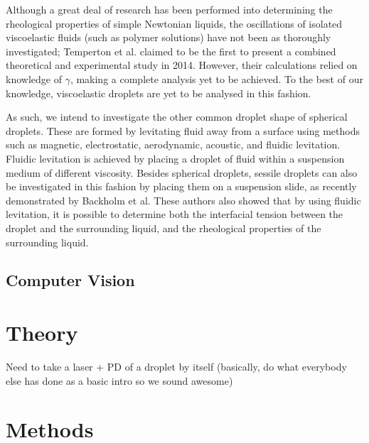 \documentclass{physics_article_B}
\begin{document}
Although a great deal of research has been performed into determining the rheological properties of simple Newtonian liquids, the oscillations of isolated viscoelastic fluids (such as polymer solutions) have not been as thoroughly investigated; Temperton et al. claimed to be the first to present a combined theoretical and experimental study in 2014\cite{temperton2014mechanical}. However, their calculations relied on knowledge of $\gamma$, making a complete analysis yet to be achieved. To the best of our knowledge, viscoelastic droplets are yet to be analysed in this fashion.

As such, we intend to investigate the other common droplet shape of spherical droplets. These are formed by levitating fluid away from a surface using methods such as magnetic\cite{temperton2014mechanical, levitate2}, electrostatic\cite{mugele2006microfluidic, wong1981dynamics}, aerodynamic\cite{benmore2017aerodynamic}, acoustic\cite{thesis, yarin1998acoustic}, and fluidic levitation. Fluidic levitation is achieved by placing a droplet of fluid within a suspension medium of different viscosity. Besides spherical droplets, sessile droplets can also be investigated in this fashion by placing them on a suspension slide, as recently demonstrated by Backholm et al\cite{backholm2017oscillating}. These authors also showed that\cite{backholm2017oscillating} by using fluidic levitation, it is possible to determine both the interfacial tension between the droplet and the surrounding liquid, and the rheological properties of the surrounding liquid.\\

\subsection{Computer Vision}

\section{Theory\label{sect:theory}}

Need to take a laser + PD of a droplet by itself (basically, do what everybody else has done as a basic intro so we sound awesome)



\section{Methods\label{sect:loop}}
\end{document}
